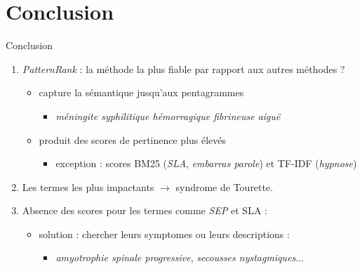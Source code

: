 \documentclass[xcolor={table,usenames,dvipsnames}]{beamer}
\let\olditem\item
\renewcommand{\item}{%
\olditem\vspace{0pt}}
\begin{document}
\section[Conclusion]{Conclusion}
\begin{frame}{Conclusion}
	\begin{enumerate}
		\item 	\textit{PatternRank} : la méthode la plus fiable par rapport aux autres méthodes ?
		\begin{itemize}
			\item capture la sémantique jusqu'aux pentagrammes
			\begin{itemize}
				\item \textit{méningite syphilitique hémorragique fibrineuse aiguë}
			\end{itemize}
			\item produit des scores de pertinence plus élevés
			\begin{itemize}
				\item exception : scores BM25 (\textit{SLA}, \textit{embarras parole}) et TF-IDF (\textit{hypnose})
			\end{itemize}
		\end{itemize}
		
		\item 	Les termes les plus impactants $\rightarrow$ syndrome de Tourette.
		
		\item Absence des scores pour les termes comme \textit{SEP} et SLA :
		\begin{itemize}                                        
			\item solution : chercher leurs symptomes ou leurs descriptions :
			\begin{itemize}
				\item  \textit{amyotrophie spinale progressive}, \textit{secousses nystagmiques}$\dots$
			\end{itemize}
		\end{itemize}
	\end{enumerate}
	

		
	\end{frame}
%
%
\end{document}
